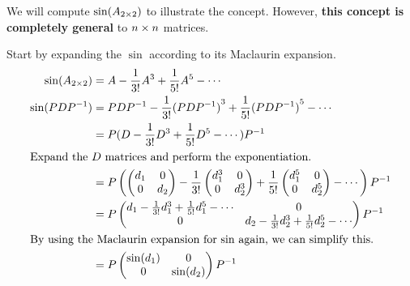 \begin{blackbox}
  We will compute $\sin(A_{2 \times 2})$ to illustrate the concept.
  However, \textbf{this concept is completely general} to $n \times n$ matrices.

  Start by expanding the $\sin$ according to its Maclaurin expansion.
  \begin{align*}
    \sin(A_{2 \times 2}) &= A - \frac{1}{3!} A^{3} + \frac{1}{5!} A^{5} - \cdots \\
    \sin(P D P^{-1}) &=  P D P^{-1} - \frac{1}{3!} {(P D P^{-1})}^{3} + \frac{1}{5!} {(P D P^{-1})}^{5} - \cdots \\
                      &= P (D - \frac{1}{3!} D^{3} + \frac{1}{5!} D^{5} - \cdots) P^{-1} \\
    \intertext{Expand the $D$ matrices and perform the exponentiation.}
    &= P \left(
      \begin{pmatrix}
        d_{1} & 0 \\
        0 & d_{2}
      \end{pmatrix} - \frac{1}{3!}
            \begin{pmatrix}
        d_{1}^{3} & 0 \\
        0 & d_{2}^{3}
      \end{pmatrix} + \frac{1}{5!}
            \begin{pmatrix}
        d_{1}^{5} & 0 \\
        0 & d_{2}^{5}
      \end{pmatrix} - \cdots \right) P^{-1} \\
    &= P
      \begin{pmatrix}
        d_{1} - \frac{1}{3!}d_{1}^{3} + \frac{1}{5!} d_{1}^{5} - \cdots & 0 \\
        0 & d_{2} - \frac{1}{3!}d_{2}^{3} + \frac{1}{5!} d_{2}^{5} - \cdots \\
      \end{pmatrix} P^{-1} \\
    \intertext{By using the Maclaurin expansion for $\sin$ again, we can simplify this.}
    &= P
      \begin{pmatrix}
        \sin(d_{1}) & 0 \\
        0 & \sin(d_{2}) \\
      \end{pmatrix} P^{-1}
  \end{align*}
\end{blackbox}

